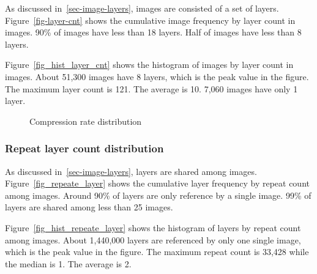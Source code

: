 As discussed in~\ref{sec-image-layers}, images are consisted of a set of layers. Figure~\ref{fig-layer-cnt} shows the cumulative image frequency by layer count in images. 90\% of images have less than 18 layers. Half of images have less than 8 layers. 

Figure~\ref{fig_hist_layer_cnt} shows the histogram of images by layer count in images. About 51,300 images have 8 layers, which is the peak value in the figure. The maximum layer count is 121. The average is 10. 7,060 images have only 1 layer. 

\begin{figure}[!t]
	\centering
	\caption{Compression rate distribution}
	\label{fig-repeat-layer-cnt}
\end{figure}

\subsubsection{Repeat layer count distribution}

As discussed in~\ref{sec-image-layers}, layers are shared among images. Figure~\ref{fig_repeate_layer} shows the cumulative layer frequency by repeat count among images. Around 90\% of layers are only reference by a single image. 99\% of layers are shared among less than 25 images. 

Figure~\ref{fig_hist_repeate_layer} shows the histogram of layers by repeat count among images. About 1,440,000 layers are referenced by only one single image, which is the peak value in the figure. The maximum repeat count is 33,428 while the median is 1. The average is 2.

